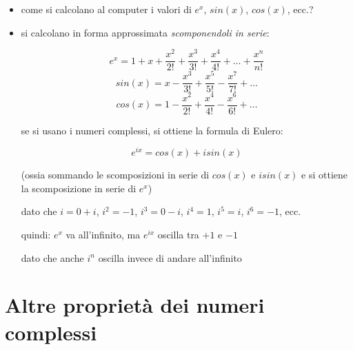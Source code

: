 \begin{itemize}

  \item come si calcolano al computer i valori di
    $e^x$, $sin(x)$, $cos(x)$, ecc.?

	\item si calcolano in forma approssimata \emph{scomponendoli in serie}:

		\begin{equation}
    	  e^x = 1 + x + \frac{x^2}{2!} + \frac{x^3}{3!} + \frac{x^4}{4!} + \ldots + \frac{x^n}{n!}
		\end{equation}
		\begin{equation}
       sin(x) = x - \frac{x^3}{3!} + \frac{x^5}{5!} - \frac{x^7}{7!} + \ldots
		\end{equation}
		\begin{equation}
       cos(x) = 1 - \frac{x^2}{2!} + \frac{x^4}{4!} - \frac{x^6}{6!} + \ldots
		\end{equation}

    se si usano i numeri complessi, si ottiene la formula di Eulero:

		\begin{equation}
    	e^{ix} = cos(x) + i sin(x)
		\end{equation}

		(ossia sommando le scomposizioni in serie di $cos(x)$ e $i sin(x)$ e
		si ottiene la scomposizione in serie di $e^x$)

		dato che $i = 0 + i$, $i^2 = -1$, $i^3 = 0 - i$, $i^4 = 1$, $i^5 = i$, $i^6 = -1$, ecc.

    quindi: $e^x$ va all'infinito, ma $e^{ix}$ oscilla tra $+1$ e $-1$

    dato che anche $i^n$ oscilla invece di andare all'infinito

\end{itemize}

\section{Altre propriet\`a dei numeri complessi}

